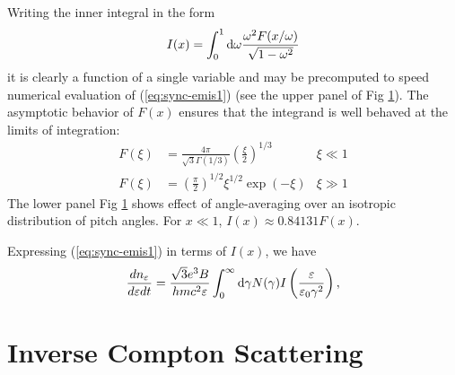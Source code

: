\documentclass[12pt]{article}
\newcommand{\D}{{\rm d}}
\begin{document}
Writing the inner integral in the form
\begin{equation}
I(x) = \int_0^1 \D \omega \frac{\omega^2 F(x/\omega)}{\sqrt{1 - \omega^2}}
\end{equation}
it is clearly a function of a single variable and may be
precomputed to speed numerical evaluation of (\ref{eq:sync-emis1})
(see the upper panel of Fig \ref{anglefun-fig}).
The asymptotic behavior of $F(x)$ ensures that the integrand
is well behaved at the limits of integration:
\begin{align}
F(\xi) &=
\frac{4\pi}{\sqrt{3}\Gamma(1/3)}\left(\frac{\xi}{2}\right)^{1/3}
     & \xi \ll 1 \\
F(\xi) &=
\left(\frac{\pi}{2}\right)^{1/2}\xi^{1/2} \exp(-\xi)
     & \xi \gg 1
\end{align}
The lower panel Fig \ref{anglefun-fig} shows
effect of angle-averaging over an isotropic distribution of pitch
angles.  For $x \ll 1$, $I(x) \approx 0.84131 F(x)$.

Expressing (\ref{eq:sync-emis1}) in terms of $I(x)$, we have
\begin{equation}
\frac{dn_\varepsilon}{d\varepsilon dt} =
\frac{\sqrt{3} e^3 B}{hmc^2\varepsilon}
\int_0^\infty \D\gamma N(\gamma) I\left(\frac{\varepsilon}{\varepsilon_0\gamma^2}\right),
\label{eq:sync-emis}
\end{equation}

\begin{figure}
\hbox{\hspace*{-0.25in}}
\caption{}
\label{anglefun-fig}
\end{figure}

\clearpage
\newpage

\section{Inverse Compton Scattering}
\end{document}
